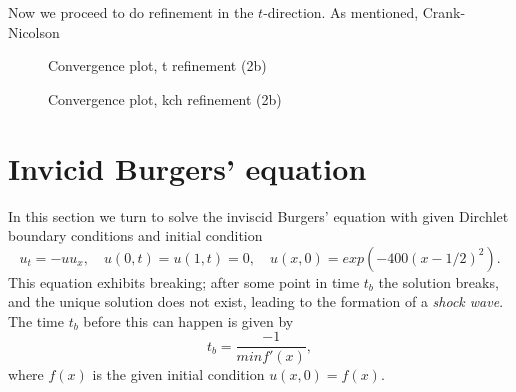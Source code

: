 Now we proceed to do refinement in the $t$-direction. 
As mentioned, Crank-Nicolson
\begin{figure}[ht]
    \centering
    
    \caption{Convergence plot, t refinement (2b)}
    \label{fig:2b-temporal-ref}
\end{figure}

\begin{figure}[ht]
    \centering
    
    \caption{Convergence plot, kch refinement (2b)}
    \label{fig:2b-kch-ref}
\end{figure}


%
%    

\section{Invicid Burgers' equation}

In this section we turn to solve the inviscid Burgers' equation with given Dirchlet boundary conditions and initial condition
\begin{equation}
    u_t = -uu_x, \quad u(0, t) = u(1, t) = 0, \quad u(x, 0) = exp(-400(x-1/2)^2).
    \label{eq:burger}
\end{equation}
This equation exhibits breaking; 
after some point in time $t_b$ the solution breaks, 
and the unique solution does not exist, 
leading to the formation of a \textit{shock wave}.\cite{burgers} 
The time $t_b$ before this can happen is given by
\begin{equation}
    t_b = \frac{-1}{min f'(x)}, 
    \label{eq:t_break}
\end{equation}
where $f(x)$ is the given initial condition $u(x, 0) = f(x)$.\cite{burgers} 

